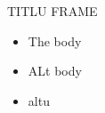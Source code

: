 \documentclass{beamer}
\begin{document}
\begin{frame}
	\titlepage
\end{frame}

\begin{frame}{TITLU FRAME}

\begin{itemize}
	\item The body
	\pause
	\item ALt body
	\pause
	\item altu
\end{itemize}

\end{frame}

\begin{frame}
\begin{adjustbox}{max totalsize={.9\textwidth}{.7\textheight},center}
\end{adjustbox}
\end{frame}
\end{document}
